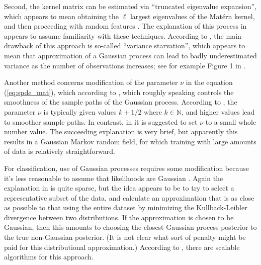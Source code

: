 Second, the kernel matrix can be estimated via ``truncated eigenvalue expansion'', which appears to mean obtaining the $\ell$ largest eigenvalues of the Mat\'{e}rn kernel, and then proceeding with random features \cite{rahimi2007random}. The explanation of this process in \cite{pmlr-v130-borovitskiy21a} appears to assume familiarity with these techniques. According to \cite{pmlr-v130-borovitskiy21a}, the main drawback of this approach is so-called ``variance starvation'', which appears to mean that approximation of a Gaussian process can lead to badly underestimated variance as the number of observations increases; see for example Figure 1 in \cite{wang2018batched}.

Another method concerns modification of the parameter $\nu$ in the equation (\ref{eq:spde_mat}), which according to \cite{pmlr-v130-borovitskiy21a}, which roughly speaking controls the smoothness of the sample paths of the Gaussian process. According to \cite{garnett_bayesoptbook_2023}, the parameter $\nu$ is typically given values $k + 1/2$ where $k \in \mathbb N$, and higher values lead to smoother sample paths. In contrast, in \cite{pmlr-v130-borovitskiy21a} it is suggested to set $\nu$ to a small whole number value. The succeeding explanation is very brief, but apparently this results in a Gaussian Markov random field, for which training with large amounts of data is relatively straightforward.

For classification, use of Gaussian processes requires some modification because it's less reasonable to assume that likelihoods are Gaussian \cite{rw}. Again the explanation in \cite{pmlr-v130-borovitskiy21a} is quite sparse, but the idea appears to be to try to select a representative subset of the data, and calculate an approximation that is as close as possible to that using the entire dataset by minimizing the Kullback-Leibler divergence between two distributions. If the approximation is chosen to be Gaussian, then this amounts to choosing the closest Gaussian process posterior to the true non-Gaussian posterior. (It is not clear what sort of penalty might be paid for this distributional approximation.) According to \cite{pmlr-v130-borovitskiy21a}, there are scalable algorithms for this approach.


